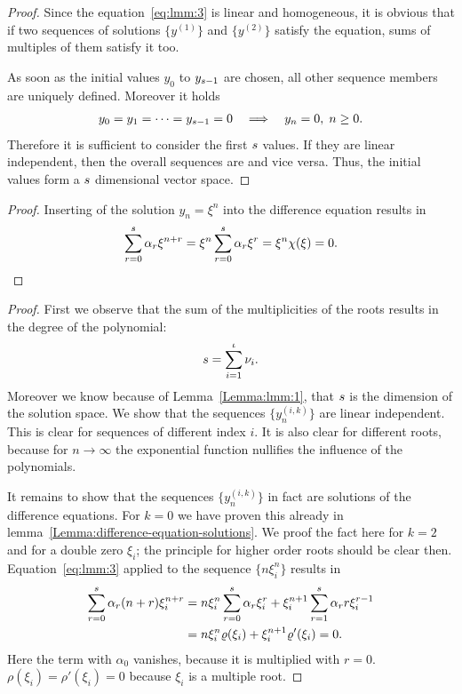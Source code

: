 \begin{proof}
  Since the equation~\eqref{eq:lmm:3} is linear and homogeneous, it is
  obvious that if two sequences of solutions $\{y^{(1)}\}$ and
  $\{y^{(2)}\}$ satisfy the equation, sums of multiples of them
  satisfy it too.

  As soon as the initial values $y_0$ to $y_{s-1}$ are chosen, all
  other sequence members are uniquely defined.  Moreover it holds
  \begin{gather*}
    y_0=y_1=\dots=y_{s-1}=0
    \quad\Longrightarrow\quad
    y_n = 0, \;n \ge 0.
  \end{gather*}
  Therefore it is sufficient to consider the first $s$ values.  If
  they are linear independent, then the overall sequences are and vice
  versa. Thus, the initial values form a $s$
  dimensional vector space.
\end{proof}



\begin{proof}
  Inserting of the solution $y_n = \xi^n$ into the difference equation
  results in
  \begin{gather*}
    \sum_{r=0}^s \alpha_{r} \xi^{n+r} = \xi^{n}
    \sum_{r=0}^s \alpha_{r} \xi^{r}
    = \xi^{n} \chi(\xi) = 0.
  \end{gather*}
\end{proof}



\begin{proof}
  First we observe that the sum of the multiplicities of the roots
  results in the degree of the polynomial:
  \begin{gather*}
    s = \sum_{i=1}^\iota \nu_i.
  \end{gather*}
  Moreover we know because of Lemma~\ref{Lemma:lmm:1}, that $s$ is
  the dimension of the solution space. We show that the sequences
  $\{y^{(i,k)}_n\}$ are linear independent. This is clear for
  sequences of different index $i$. It is also clear for different roots,
  because for $n\to\infty$ the exponential function nullifies the
  influence of the polynomials.
  
  It remains to show that the sequences $\{y^{(i,k)}_n\}$ in fact are
  solutions of the difference equations.  For $k=0$ we have proven
  this already in lemma~\ref{Lemma:difference-equation-solutions}.  We proof the fact here for
  $k=2$ and for a double zero $\xi_i$; the principle for higher order
  roots should be clear then.  Equation~\eqref{eq:lmm:3} applied to
  the sequence $\{n \xi_i^n\}$ results in
  \begin{align*}
    \sum_{r=0}^{s} \alpha_r (n+r) \xi_i^{n+r}
    &= n \xi_i^n \sum_{r=0}^{s} \alpha_r \xi_i^{r}
    + \xi_i^{n+1} \sum_{r=1}^{s} \alpha_r r \xi_i^{r-1}
    \\
    &= n \xi_i^n \varrho(\xi_i) + \xi_i^{n+1} \varrho'(\xi_i) = 0.
  \end{align*}
  Here the term with $\alpha_0$ vanishes, because it is multiplied
  with $r=0$. $\rho(\xi_i) = \rho'(\xi_i) = 0$ because $\xi_i$ is a
  multiple root.
\end{proof}

